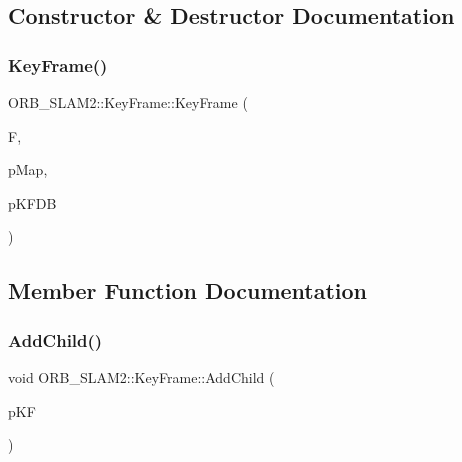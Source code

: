 \subsection{Constructor \& Destructor Documentation}
\mbox{\label{class_o_r_b___s_l_a_m2_1_1_key_frame_a6b2fd06ed5e4a8f9546c515db554bcb6}} 
\subsubsection{\texorpdfstring{Key\+Frame()}{KeyFrame()}}
{\footnotesize\ttfamily O\+R\+B\+\_\+\+S\+L\+A\+M2\+::\+Key\+Frame\+::\+Key\+Frame (\begin{DoxyParamCaption}\item[{\mbox{\hyperlink{class_o_r_b___s_l_a_m2_1_1_frame}{Frame}} \&}]{F,  }\item[{\mbox{\hyperlink{class_o_r_b___s_l_a_m2_1_1_map}{Map}} $\ast$}]{p\+Map,  }\item[{\mbox{\hyperlink{class_o_r_b___s_l_a_m2_1_1_key_frame_database}{Key\+Frame\+Database}} $\ast$}]{p\+K\+F\+DB }\end{DoxyParamCaption})}



\subsection{Member Function Documentation}
\mbox{\label{class_o_r_b___s_l_a_m2_1_1_key_frame_a2394adfb627d9cf87ed8da78f6b0d709}} 
\subsubsection{\texorpdfstring{Add\+Child()}{AddChild()}}
{\footnotesize\ttfamily void O\+R\+B\+\_\+\+S\+L\+A\+M2\+::\+Key\+Frame\+::\+Add\+Child (\begin{DoxyParamCaption}\item[{\mbox{\hyperlink{class_o_r_b___s_l_a_m2_1_1_key_frame}{Key\+Frame}} $\ast$}]{p\+KF }\end{DoxyParamCaption})}

